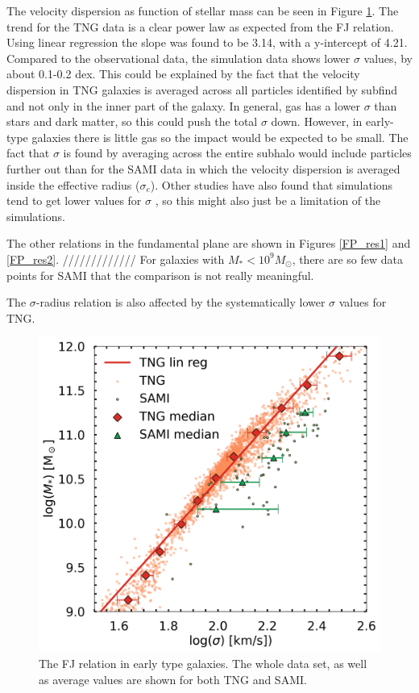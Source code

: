 The velocity dispersion as function of stellar mass can be seen in Figure \ref{FJ_res}. The trend for the TNG data is a clear power law as expected from the FJ relation. Using linear regression the slope was found to be 3.14, with a y-intercept of 4.21. Compared to the observational data, the simulation data shows lower $\sigma$ values, by about 0.1-0.2 dex. This could be explained by the fact that the velocity dispersion in TNG galaxies is averaged across all particles identified by subfind and not only in the inner part of the galaxy. In general, gas has a lower $\sigma$ than stars and dark matter, so this could push the total $\sigma$ down. However, in early-type galaxies there is little gas so the impact would be expected to be small. The fact that $\sigma$ is found by averaging across the entire subhalo would include particles further out than for the SAMI data in which the velocity dispersion is averaged inside the effective radius ($\sigma_{e}$). Other studies have also found that simulations tend to get lower values for $\sigma$ \parencite{Sande2018}, so this might also just be a limitation of the simulations.

The other relations in the fundamental plane are shown in Figures \ref{FP_res1} and \ref{FP_res2}. 
/////////////
For galaxies with $M_*<10^9 M_{\odot}$, there are so few data points for SAMI that the comparison is not really meaningful. 

The $\sigma$-radius relation is also affected by the systematically lower $\sigma$ values for TNG. 

\begin{figure}
    \centering
    \includegraphics[width=\textwidth]{images/results_faber_jackson.png}
    \caption{The FJ relation in early type galaxies. The whole data set, as well as average values are shown for both TNG and SAMI.}
    \label{FJ_res}
\end{figure}

